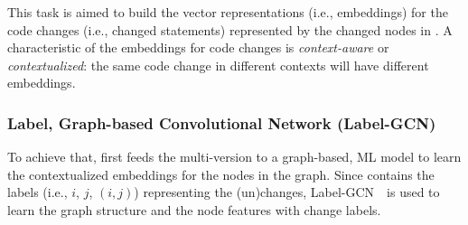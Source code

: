 This task is aimed to build the vector representations (i.e.,
embeddings) for the code changes (i.e., changed statements)
represented by the changed nodes in {\mvpdg}. A characteristic of the
embeddings for code changes is {\em context-aware} or {\em
  contextualized}: the same code change in different contexts
will have different embeddings.

\subsubsection{{\bf Label, Graph-based Convolutional Network (Label-GCN)}}

To achieve that, {\tool} first feeds the multi-version {\mvpdg} to a
graph-based, ML model to learn the contextualized
embeddings for the nodes in the graph. Since {\mvpdg} contains the
labels (i.e., $i$, $j$, $(i,j)$) representing the (un)changes,
Label-GCN~\cite{label-gcn}~is used to learn the graph structure and
the node features with change labels.




